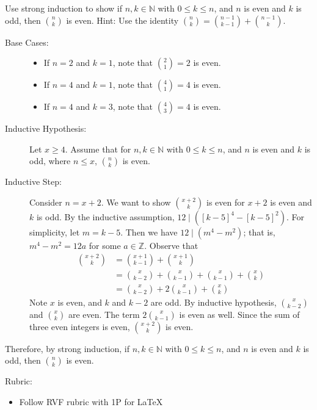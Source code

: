 \documentclass{article}
\newcommand{\Z}{\mathbb{Z}}
\theoremstyle{definition}
\begin{document}
\begin{question}
    Use strong induction to show if $n, k\in \mathbb{N}$ with $0\leq k\leq n$, and $n$ is even and $k$ is odd, then $\binom{n}{k}$ is even. Hint: Use the identity $\binom{n}{k} = \binom{n-1}{k-1} + \binom{n-1}{k}$.
\end{question}
\begin{solution}
	\begin{description}
	\item[Base Cases: ] 
	\begin{itemize}
	\item If $n=2$ and $k=1$, note that $\binom{2}{1} =2$ is even.
	\item If $n=4$ and $k=1$, note that $\binom{4}{1} =4$ is even.
	\item If $n=4$ and $k=3$, note that $\binom{4}{3} =4$ is even.
	\end{itemize}
	
	\item[Inductive Hypothesis: ] Let $x\geq 4$. Assume that for $n, k\in \mathbb{N}$ with $0\leq k\leq n$, and $n$ is even and $k$ is odd, where $n\leq x$, $\binom{n}{k}$ is even.
	
	\item[Inductive Step: ] Consider $n=x+2$.  We want to show $\binom{x+2}{k}$ is even for $x+2$ is even and $k$ is odd. 
	By the inductive assumption, $12 \mid ([k-5]^4-[k-5]^2)$. For simplicity, let $m=k-5$. Then we have $12\mid (m^4-m^2)$; that is, $m^4-m^2=12a$ for some $a\in \Z$. Observe that
	\begin{align*}
	\binom{x+2}{k}  & = \binom{x+1}{k-1} + \binom{x+1}{k}\\
				& = \binom{x}{k-2} + \binom{x}{k-1}+\binom{x}{k-1} + \binom{x}{k}\\
				& =  \binom{x}{k-2} + 2\binom{x}{k-1} + \binom{x}{k}
	\end{align*}
	Note $x$ is even, and $k$ and $k-2$ are odd. By inductive hypothesis, $\binom{x}{k-2}$ and $\binom{x}{k}$ are even. The term $2\binom{x}{k-1}$ is even as well. Since the sum of three even integers is even, $\binom{x+2}{k}$ is even.
	\end{description}
	Therefore, by strong induction, if $n, k\in \mathbb{N}$ with $0\leq k\leq n$, and $n$ is even and $k$ is odd, then $\binom{n}{k}$ is even.
	
{\color{red} Rubric:
\begin{itemize}
\item Follow RVF rubric with 1P for \LaTeX
\end{itemize}}
\end{solution}
\end{document}
